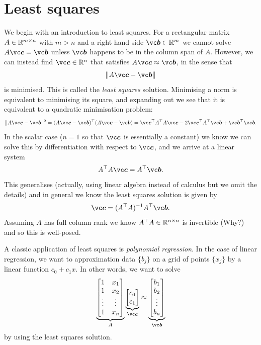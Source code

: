 \section{Least squares}
We begin with an introduction to least squares.  For a rectangular matrix $A \in {\mathbb R}^{m \times n}$ with $m > n$ and a right-hand side $\ensuremath{\bm{\b}} \ensuremath{\in} \ensuremath{\bbR}^m$ we cannot solve $A \ensuremath{\bm{\c}} = \ensuremath{\bm{\b}}$ unless $\ensuremath{\bm{\b}}$ happens to be in the column span of $A$. However, we can instead find $\ensuremath{\bm{\c}} \ensuremath{\in} \ensuremath{\bbR}^n$ that satisfies $A \ensuremath{\bm{\c}} \ensuremath{\approx} \ensuremath{\bm{\b}}$, in the sense that
\[
\| A\ensuremath{\bm{\c}} - \ensuremath{\bm{\b}}\|
\]
is minimised. This is called the \emph{least squares} solution.  Minimising a norm is equivalent to minimising its square, and expanding out we see that it is equivalent to a quadratic minimisation problem:
\[
\| A\ensuremath{\bm{\c}} - \ensuremath{\bm{\b}}\|^2 = (A\ensuremath{\bm{\c}} - \ensuremath{\bm{\b}})^\ensuremath{\top} (A\ensuremath{\bm{\c}} - \ensuremath{\bm{\b}}) = \ensuremath{\bm{\c}}^\ensuremath{\top} A^\ensuremath{\top} A \ensuremath{\bm{\c}} - 2 \ensuremath{\bm{\c}}^\ensuremath{\top} A^\ensuremath{\top} \ensuremath{\bm{\b}}  + \ensuremath{\bm{\b}}^\ensuremath{\top} \ensuremath{\bm{\b}}.
\]
In the scalar case ($n = 1$ so that $\ensuremath{\bm{\c}}$ is essentially a constant) we know we can solve this by differentiation with respect to $\ensuremath{\bm{\c}}$, and we arrive at a linear system
\[
 A^\ensuremath{\top} A \ensuremath{\bm{\c}}  =  A^\ensuremath{\top} \ensuremath{\bm{\b}}.
\]
This generalises (actually,  using linear algebra instead of calculus but we omit the details) and in general we know the least squares solution is given by
\[
\ensuremath{\bm{\c}} =  (A^\ensuremath{\top} A)^{-1} A^\ensuremath{\top} \ensuremath{\bm{\b}}.
\]
Assuming $A$ has full column rank we know $A^\top A \in {\mathbb R}^{n \times n}$ is invertible (Why?) and so this is well-posed.

A classic application of least squares is \emph{polynomial regression}. In the case of linear regression, we want to approximation data $\{b_j\}$ on a grid of points $\{x_j\}$ by a linear function $c_0 + c_1 x$. In other words, we want to solve
\[
\underbrace{\begin{bmatrix} 1 & x_1 \\
1 & x_2 \\
\ensuremath{\vdots} & \ensuremath{\vdots} \\
1 & x_n
\end{bmatrix}}_A \underbrace{\begin{bmatrix} c_0 \\
c_1
\end{bmatrix}}_{\ensuremath{\bm{\c}}} \ensuremath{\approx} \underbrace{\begin{bmatrix}
b_1 \\
b_2 \\
\ensuremath{\vdots} \\
b_n
\end{bmatrix}}_{\ensuremath{\bm{\b}}}
\]
by using the least squares solution.

